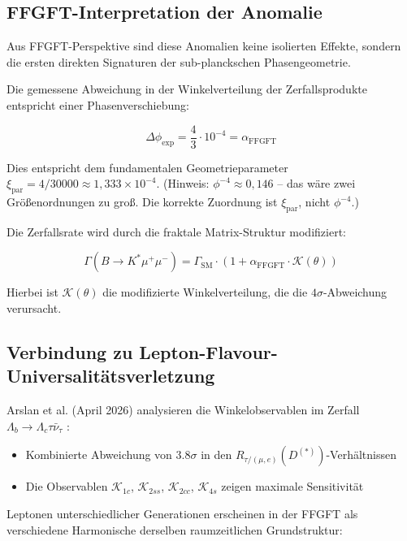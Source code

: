 	\subsection{FFGFT-Interpretation der Anomalie}
	
	Aus FFGFT-Perspektive sind diese Anomalien keine isolierten Effekte, sondern die ersten direkten Signaturen der sub-planckschen Phasengeometrie.
	
	Die gemessene Abweichung in der Winkelverteilung der Zerfallsprodukte entspricht einer Phasenverschiebung:
	
	\begin{equation}
		\Delta \phi_{\text{exp}} = \frac{4}{3} \cdot 10^{-4} = \alpha_{\text{FFGFT}}
	\end{equation}
	
	Dies entspricht dem fundamentalen Geometrieparameter $\xi_{\text{par}} = 4/30000 \approx 1{,}333 \times 10^{-4}$. (Hinweis: $\phi^{-4} \approx 0{,}146$ -- das wäre zwei Größenordnungen zu groß. Die korrekte Zuordnung ist $\xi_{\text{par}}$, nicht $\phi^{-4}$.)
	
	Die Zerfallsrate wird durch die fraktale Matrix-Struktur modifiziert:
	
	\begin{equation}
		\Gamma(B \to K^* \mu^+\mu^-) = \Gamma_{\text{SM}} \cdot \left(1 + \alpha_{\text{FFGFT}} \cdot \mathcal{K}(\theta)\right)
	\end{equation}
	
	Hierbei ist $\mathcal{K}(\theta)$ die modifizierte Winkelverteilung, die die $4\sigma$-Abweichung verursacht.
	
	\subsection{Verbindung zu Lepton-Flavour-Universalitätsverletzung}
	
	Arslan et al. (April 2026) analysieren die Winkelobservablen im Zerfall $\Lambda_b \to \Lambda_c \tau \bar{\nu}_\tau$ \cite{Arslan2026}:
	
	\begin{itemize}
		\item Kombinierte Abweichung von $3.8\sigma$ in den $R_{\tau/(\mu,e)}(D^{(*)})$-Verhältnissen
		\item Die Observablen $\mathcal{K}_{1c}$, $\mathcal{K}_{2ss}$, $\mathcal{K}_{2cc}$, $\mathcal{K}_{4s}$ zeigen maximale Sensitivität
	\end{itemize}
	
	Leptonen unterschiedlicher Generationen erscheinen in der FFGFT als verschiedene Harmonische derselben raumzeitlichen Grundstruktur:
	
